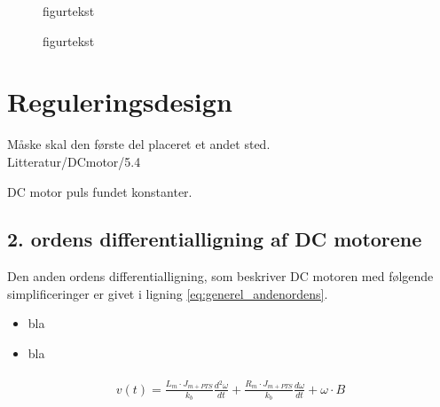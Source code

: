 \begin{figure}[!th]
\centering
\begin{tikzpicture}[auto, node distance=2.6cm,>=latex']

\end{tikzpicture}
\caption[tekst i indholdsfortegnelsen]{figurtekst}
\label{fig:}
\end{figure}

\begin{figure}[!th]
\centering
\begin{tikzpicture}[auto, node distance=2.6cm,>=latex']

\end{tikzpicture}
\caption[tekst i indholdsfortegnelsen]{figurtekst}
\label{fig:}
\end{figure}\section{Reguleringsdesign}
\label{sec:kontrollerdeign}
Måske skal den første del placeret et andet sted. \\

Litteratur/DCmotor/5.4



DC motor puls fundet konstanter.
\subsection{2. ordens differentialligning af DC motorene}
Den anden ordens differentialligning, som beskriver DC motoren med følgende simplificeringer er givet i ligning \ref{eq:generel_andenordens}.
\begin{itemize}
\item bla 
\item bla 
\end{itemize}

\begin{align}
\begin{split}
v\left( t \right) =\frac { { L }_{ m }\cdot { J }_{ m+PTS } }{ { k }_{ b } } \frac { { d }^{ 2 }\omega  }{ dt } +\frac { { R }_{ m }\cdot { J }_{ m+PTS } }{ { k }_{ b } } \frac { d\omega  }{ dt } +\omega \cdot B\label{eq:generel_andenordens}
\end{split}
\end{align}

